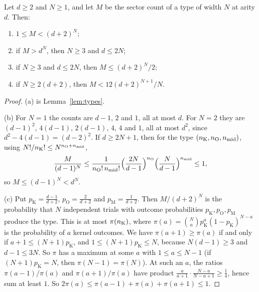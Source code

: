 \begin{lemma}\label{lem:lower-types}
Let \(d\ge2\) and \(N\ge1\), and let \(M\) be the sector count of a type
of width \(N\) at arity \(d\). Then:
\begin{enumerate}
\item[(a)] \(1\le M<(d+2)^N\);
\item[(b)] if \(M>d^N\), then \(N\ge3\) and \(d\le2N\);
\item[(c)] if \(N\ge3\) and \(d\le2N\), then \(M\le(d+2)^N/2\);
\item[(d)] if \(N\ge2(d+2)\), then \(M<12(d+2)^{N+1}/N\).
\end{enumerate}
\end{lemma}

\begin{proof}
(a) is Lemma~\ref{lem:types}.

(b) For \(N=1\) the counts are \(d-1\), \(2\) and \(1\), all at most
\(d\). For \(N=2\) they are \((d-1)^2\), \(4(d-1)\), \(2(d-1)\), \(4\),
\(4\) and \(1\), all at most \(d^2\), since \(d^2-4(d-1)=(d-2)^2\). If
\(d\ge2N+1\), then for the type \((n_{\mathrm K},n_{\mathrm O},n_{\mathrm{mid}})\), using
\(N!/n_{\mathrm K}!\le N^{n_{\mathrm O}+n_{\mathrm{mid}}}\),
\[
 \frac M{(d-1)^N}\le\frac1{n_{\mathrm O}!\,n_{\mathrm{mid}}!}\Bigl(\frac{2N}{d-1}\Bigr)^{n_{\mathrm O}}
 \Bigl(\frac N{d-1}\Bigr)^{n_{\mathrm{mid}}}\le1 ,
\]
so \(M\le(d-1)^N<d^N\).

(c) Put \(p_{\mathrm K}=\frac{d-1}{d+2}\), \(p_{\mathrm O}=\frac2{d+2}\)
and \(p_{\mathrm M}=\frac1{d+2}\). Then \(M/(d+2)^N\) is the probability
that \(N\) independent trials with outcome probabilities
\(p_{\mathrm K},p_{\mathrm O},p_{\mathrm M}\) produce the type. This is at
most \(\pi(n_{\mathrm K})\), where
\(\pi(a)=\binom Nap_{\mathrm K}^a(1-p_{\mathrm K})^{N-a}\) is the
probability of \(a\) kernel outcomes. We have \(\pi(a+1)\ge\pi(a)\) if and
only if \(a+1\le(N+1)p_{\mathrm K}\), and
\(1\le(N+1)p_{\mathrm K}\le N\), because \(N(d-1)\ge3\) and
\(d-1\le3N\). So \(\pi\) has a maximum at some \(a\) with
\(1\le a\le N-1\) (if \((N+1)p_{\mathrm K}=N\), then \(\pi(N-1)=\pi(N)\)).
At such an \(a\), the ratios \(\pi(a-1)/\pi(a)\) and \(\pi(a+1)/\pi(a)\)
have product \(\frac a{a+1}\cdot\frac{N-a}{N-a+1}\ge\frac14\), hence sum
at least \(1\). So \(2\pi(a)\le\pi(a-1)+\pi(a)+\pi(a+1)\le1\).


\end{proof}
